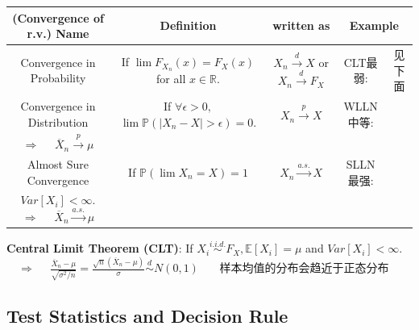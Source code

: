 \documentclass[9pt]{article}
\begin{document}
\vspace{-0.30cm}
\begin{longtable}[alignment]{|c|c|c|c|c|}
    \hline
    {\small (Convergence of r.v.)} Name & Definition & written as & \multicolumn{2}{c|}{Example} \\
    \hline
    {\small Convergence in Probability} & If $\lim F_{X_n}(x)=F_X(x)$ for all $x\in\mathbb{R}$. & $X_n\stackrel{d}{\to}X$ or $X_n\stackrel{d}{\to}F_X$ & CLT{\tiny 最弱}: & {\scriptsize 见下面} \\
    \hline
    {\small Convergence in Distribution} & If $\forall\epsilon>0,$ $\lim\mathbb{P}(|X_n-X|>\epsilon)=0$. & $X_n\stackrel{p}{\to}X$ & WLLN{\tiny 中等}: & \makecell{\scriptsize If $X_i\stackrel{i.i.d.}{\sim}F_X$, $\mathbb{E}[X_i]=\mu$. \\ \scriptsize $\Rightarrow$ \ \ $\overline{X}_n\stackrel{p}{\to}\mu$} \\
    \hline
    {\small Almost Sure Convergence} & If $\mathbb{P}(\lim X_n=X)=1$ & $X_n\stackrel{a.s.}{\to}X$ & SLLN{\tiny 最强}: & \makecell{\scriptsize If $X_i\stackrel{i.i.d.}{\sim}F_X,\mathbb{E}[X_i]=\mu$, \\ \scriptsize $Var[X_i]<\infty$. $\Rightarrow$ \ \ $\overline{X}_n\stackrel{a.s.}{\to}\mu$} \\
    \hline
\end{longtable}
\vspace{-0.38cm}

\textbf{Central Limit Theorem (CLT)}: If $X_i\stackrel{i.i.d.}{\sim}F_X,\mathbb{E}[X_i]=\mu$ and $Var[X_i]<\infty$. \ \ $\Rightarrow$ \ \ $\frac{\overline{X}_n-\mu}{\sqrt{\sigma^2/n}}=\frac{\sqrt{n}(\overline{X}_n-\mu)}{\sigma}\stackrel{d}{\sim}N(0,1)$ \ \ \ {\tiny 样本均值的分布会趋近于正态分布}


\subsection{Test Statistics and Decision Rule}
\end{document}
